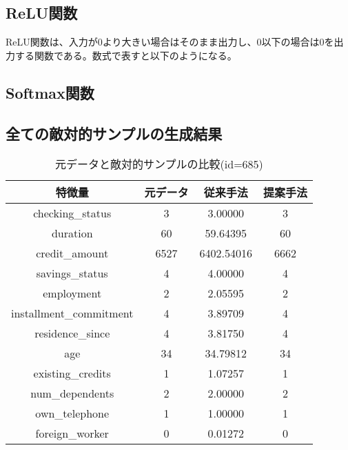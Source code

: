 \subsection*{ReLU関数}
ReLU関数は、入力が0より大きい場合はそのまま出力し、0以下の場合は0を出力する関数である。数式で表すと以下のようになる。

\subsection*{Softmax関数}

\subsection*{全ての敵対的サンプルの生成結果}
\begin{table}[H]
    \centering
    \caption{元データと敵対的サンプルの比較(id=685)}
    \begin{tabular}{|c|c|c|c|} \hline
        特徴量 & 元データ & 従来手法 & 提案手法 \\ \hline
        checking\_status & 3 & 3.00000 & 3 \\ \hline
        duration & 60 & 59.64395 & 60 \\ \hline
        credit\_amount & 6527 & 6402.54016 & 6662 \\ \hline
        savings\_status & 4 & 4.00000 & 4 \\ \hline
        employment & 2 & 2.05595 & 2 \\ \hline
        installment\_commitment & 4 & 3.89709 & 4 \\ \hline
        residence\_since & 4 & 3.81750 & 4 \\ \hline
        age & 34 & 34.79812 & 34 \\ \hline
        existing\_credits & 1 & 1.07257 & 1 \\ \hline
        num\_dependents & 2 & 2.00000 & 2 \\ \hline
        own\_telephone & 1 & 1.00000 & 1 \\ \hline
        foreign\_worker & 0 & 0.01272 & 0 \\ \hline
    \end{tabular}
\end{table}

